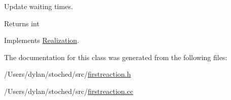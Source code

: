 Update waiting times. 

\begin{DoxyReturn}{Returns}
int 
\end{DoxyReturn}


Implements \hyperlink{class_realization_a9949217117927b149850288f3b74c9ef}{Realization}.



The documentation for this class was generated from the following files\+:\begin{DoxyCompactItemize}
\item 
/\+Users/dylan/stoched/src/\hyperlink{firstreaction_8h}{firstreaction.\+h}\item 
/\+Users/dylan/stoched/src/\hyperlink{firstreaction_8cc}{firstreaction.\+cc}\end{DoxyCompactItemize}
